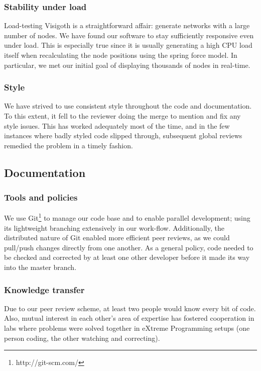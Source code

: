 \documentclass[a4paper,11pt,titlepage]{article}
\begin{document}
\subsubsection{Stability under load}
Load-testing Visigoth is a straightforward affair: generate networks
with a large number of nodes. We have found our software to stay
sufficiently responsive even under load. This is especially true
since it is usually generating a high CPU load itself when
recalculating the node positions using the spring force model. In
particular, we met our initial goal of displaying thousands of nodes
in real-time.

\subsubsection{Style}
We have strived to use consistent style throughout the code and
documentation. To this extent, it fell to the reviewer doing the
merge to mention and fix any style issues. This has worked adequately
most of the time, and in the few instances where badly styled code
slipped through, subsequent global reviews remedied the problem in a
timely fashion.


\subsection{Documentation}

\subsubsection{Tools and policies}
We use Git\footnote{http://git-scm.com/} to manage our code base and
to enable parallel development; using its lightweight branching
extensively in our work-flow. Additionally, the distributed nature
of Git enabled more efficient peer reviews, as we could pull/push
changes directly from one another. As a general policy, code needed
to be checked and corrected by at least one other developer before it
made its way into the master branch.

\subsubsection{Knowledge transfer}
Due to our peer review scheme, at least two people would know every
bit of code. Also, mutual interest in each other's area of expertise
has fostered cooperation in labs where problems were solved together
in eXtreme Programming setups (one person coding, the other watching
and correcting).
\end{document}
